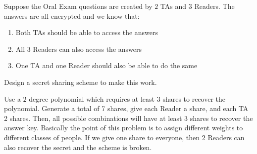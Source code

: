 \question Suppose the Oral Exam questions are created by $2$ TAs 
and $3$ Readers. The answers are all encrypted and we know that:

\begin{enumerate}[label=(\alph*)]
\item Both TAs should be able to access the answers
\item All 3 Readers can also access the answers
\item One TA and one Reader should also be able to do the same
\end{enumerate}

Design a secret sharing scheme to make this work.

\begin{solution}
Use a $2$ degree polynomial which requires at least $3$ shares to 
recover the polynomial. Generate a total of 7 shares, give each Reader 
a share, and each TA 2 shares. Then, all possible combinations will 
have at least $3$ shares to recover the answer key. Basically the point 
of this problem is to assign different weights to different classes of 
people. If we give one share to everyone, then $2$ Readers can also 
recover the secret and the scheme is broken.
\end{solution}

\clearpage